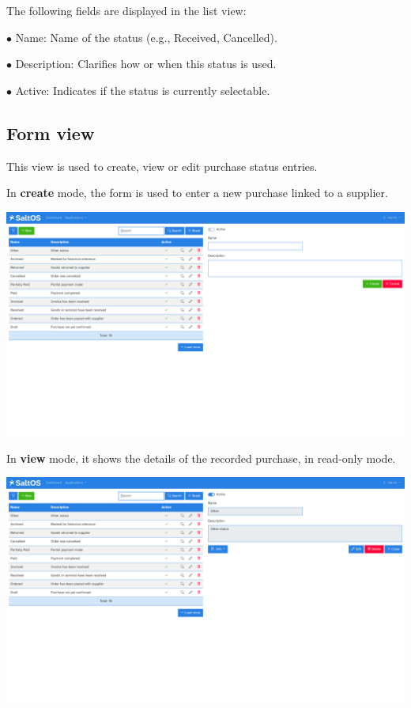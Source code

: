 \documentclass[a4paper]{article}
\begin{document}
The following fields are displayed in the list view:

\begin{compactitem}
\item[\color{myblue}$\bullet$] Name: Name of the status (e.g., Received, Cancelled).
\item[\color{myblue}$\bullet$] Description: Clarifies how or when this status is used.
\item[\color{myblue}$\bullet$] Active: Indicates if the status is currently selectable.
\end{compactitem}

\hypertarget{toc124}{}
\subsection{Form view}

This view is used to create, view or edit purchase status entries.

In \textbf{create} mode, the form is used to enter a new purchase linked to a supplier.

\begin{center}\includegraphics[width=1\textwidth]{../ujest/snaps/test-screenshots-js-screenshots-purchases-purchase-status-create-en-us-1-snap.png}\end{center}

In \textbf{view} mode, it shows the details of the recorded purchase, in read-only mode.

\begin{center}\includegraphics[width=1\textwidth]{../ujest/snaps/test-screenshots-js-screenshots-purchases-purchase-status-view-10-en-us-1-snap.png}\end{center}
\end{document}
